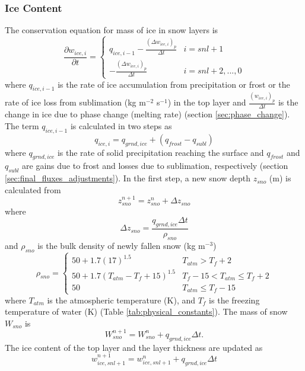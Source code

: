 \documentclass[12pt,authoryear]{elsarticle}
\numberwithin{equation}{section} %
\begin{document}
\subsubsection{Ice Content}
\label{sec:ice_content}
%
The conservation equation for mass of ice in snow layers is
\begin{equation}
\frac{\partial w_{ice,i}}{\partial t} = 
\begin{cases}
q_{ice,i-1}-\frac{(\Delta w_{ice,i})_{p}}{\Delta t} & i=snl+1 \\
-\frac{(\Delta w_{ice,i})_{p}}{\Delta t} & i=snl+2,...,0
\end{cases}
\end{equation}
where $q_{ice,i-1}$ is the rate of ice accumulation from precipitation or frost or the rate of ice loss from sublimation (kg m$^{-2}$ s$^{-1}$) in the top layer and $\frac{(w_{ice,i})_{p}}{\Delta t}$ is the change in ice
due to phase change (melting rate) (section \ref{sec:phase_change}). The term $q_{ice,i-1}$ is calculated in two steps as 
\begin{equation}
q_{ice,i}=q_{grnd,ice}+(q_{frost}-q_{subl})
\end{equation}
where $q_{grnd,ice}$ is the rate of solid precipitation reaching the surface and $q_{frost}$ and $q_{subl}$ are gains due to frost and losses due to sublimation, respectively (section \ref{sec:final_fluxes_adjustments}). In the first step, a new snow depth $z_{sno}$ (m) is calculated from
\begin{equation}
z_{sno}^{n+1} = z_{sno}^{n} + \Delta z_{sno}
\end{equation}
where
\begin{equation}
\Delta z_{sno} = \frac{q_{grnd,ice}\Delta t}{\rho_{sno}}
\end{equation}
and $\rho_{sno}$ is the bulk density of newly fallen snow (kg m$^{-3}$) \citep{andersonPointEnergyMass1976}
\begin{equation}
\rho_{sno}=
\begin{cases}
50+1.7(17)^{1.5} & T_{atm} >T_{f}+2 \\
50+1.7(T_{atm}-T_{f}+15)^{1.5} & T_{f}-15 < T_{atm} \leq T_{f}+2 \\
50 & T_{atm} \leq T_{f}-15
\end{cases}
\end{equation}
where $T_{atm}$ is the atmospheric temperature (K), and $T_{f}$ is the freezing temperature of water (K) (Table \ref{tab:physical_constants}). The mass of snow $W_{sno}$ is 
\begin{equation}
W_{sno}^{n+1}= W_{sno}^{n}+ q_{grnd,ice} \Delta t.
\end{equation}
The ice content of the top layer and the layer thickness are updated as
\begin{equation}
w_{ice,snl+1}^{n+1} = w_{ice,snl+1}^{n} + q_{grnd,ice} \Delta t
\end{equation}
\end{document}
